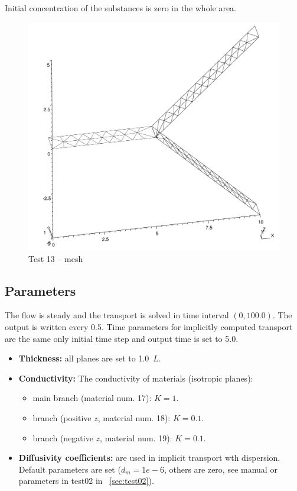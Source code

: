 Initial concentration of the substances is zero in the whole area. 
%
\begin{figure}[htb!]
\centering
\includegraphics[width=12cm]{tests_graphics/13_mesh.pdf}
\caption{Test 13 -- mesh}
\label{fig:test13_mesh}
\end{figure}
%
%
\subsection*{Parameters}
The flow is steady and the transport is solved in time interval $(0,100.0)$. The output is written every 0.5. Time parameters for implicitly computed transport are the same only initial time step and output time is set to 5.0.
\begin{itemize}
  \item \textbf{Thickness:} all planes are set to 1.0~$L$.
  \item \textbf{Conductivity:} The conductivity of materials (isotropic planes):
    \begin{itemize}
      \item main branch (material num. 17): $K=1$.
      \item branch (positive $z$, material num. 18): $K=0.1$.
      \item branch (negative $z$, material num. 19): $K=0.1$.
    \end{itemize}
  \item \textbf{Diffusivity coefficients:} are used in implicit transport wth dispersion. 
	Default parameters are set ($d_m=1e-6$, others are zero, see manual or parameters in test02 in ~\ref{sec:test02}).
\end{itemize}

